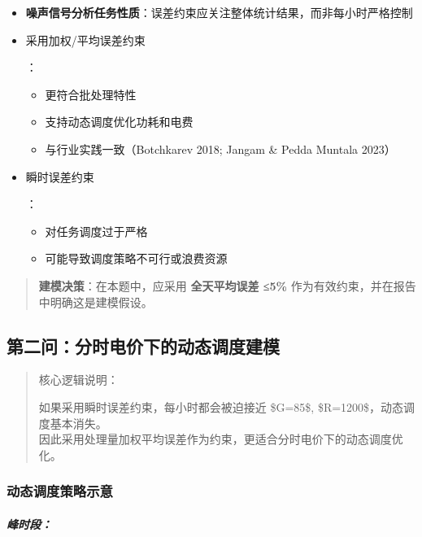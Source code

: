 \documentclass[
]{article}
\begin{document}
\begin{itemize}
\item
  \textbf{噪声信号分析任务性质}：误差约束应关注整体统计结果，而非每小时严格控制
\item
  采用加权/平均误差约束

  ：

  \begin{itemize}
  \item
    更符合批处理特性
  \item
    支持动态调度优化功耗和电费
  \item
    与行业实践一致（Botchkarev 2018; Jangam \& Pedda Muntala 2023）
  \end{itemize}
\item
  瞬时误差约束

  ：

  \begin{itemize}
  \item
    对任务调度过于严格
  \item
    可能导致调度策略不可行或浪费资源
  \end{itemize}
\end{itemize}

\begin{quote}
\textbf{建模决策}：在本题中，应采用 \textbf{全天平均误差 ≤5\%}
作为有效约束，并在报告中明确这是建模假设。
\end{quote}

\subsection{第二问：分时电价下的动态调度建模}\label{ux7b2cux4e8cux95eeux5206ux65f6ux7535ux4ef7ux4e0bux7684ux52a8ux6001ux8c03ux5ea6ux5efaux6a21}

\begin{quote}
核心逻辑说明：

如果采用瞬时误差约束，每小时都会被迫接近 \$G=85\$,
\$R=1200\$，动态调度基本消失。\\
因此采用处理量加权平均误差作为约束，更适合分时电价下的动态调度优化。
\end{quote}

\subsubsection{动态调度策略示意}\label{ux52a8ux6001ux8c03ux5ea6ux7b56ux7565ux793aux610f}

\subparagraph{峰时段：}\label{ux5cf0ux65f6ux6bb5}
\end{document}

